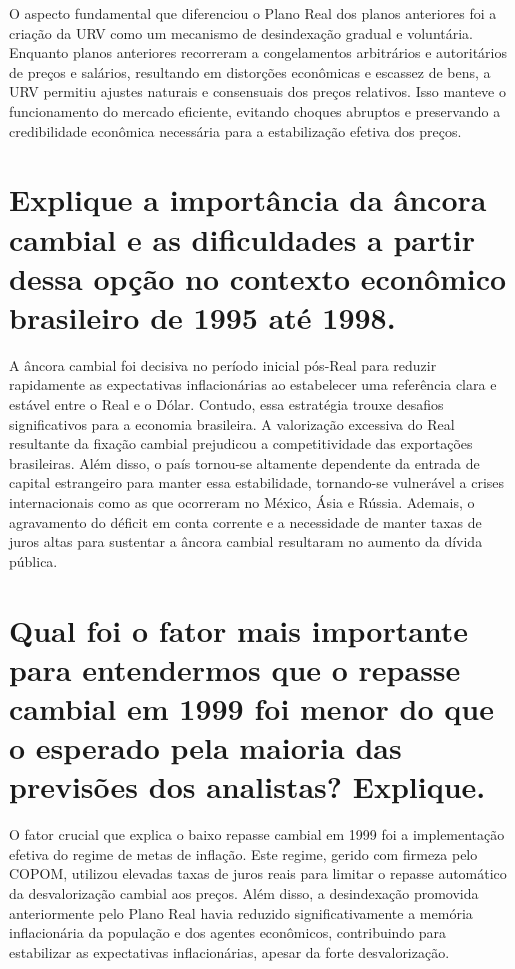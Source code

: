 \documentclass{sciposter}
\begin{document}
\begin{multicols}{3}
O aspecto fundamental que diferenciou o Plano Real dos planos anteriores foi a criação da URV como um mecanismo de desindexação gradual e voluntária. Enquanto planos anteriores recorreram a congelamentos arbitrários e autoritários de preços e salários, resultando em distorções econômicas e escassez de bens, a URV permitiu ajustes naturais e consensuais dos preços relativos. Isso manteve o funcionamento do mercado eficiente, evitando choques abruptos e preservando a credibilidade econômica necessária para a estabilização efetiva dos preços.

\section{\textbf{Explique a importância da âncora cambial e as dificuldades a partir dessa opção no contexto econômico brasileiro de 1995 até 1998.}}

A âncora cambial foi decisiva no período inicial pós-Real para reduzir rapidamente as expectativas inflacionárias ao estabelecer uma referência clara e estável entre o Real e o Dólar. Contudo, essa estratégia trouxe desafios significativos para a economia brasileira. A valorização excessiva do Real resultante da fixação cambial prejudicou a competitividade das exportações brasileiras. Além disso, o país tornou-se altamente dependente da entrada de capital estrangeiro para manter essa estabilidade, tornando-se vulnerável a crises internacionais como as que ocorreram no México, Ásia e Rússia. Ademais, o agravamento do déficit em conta corrente e a necessidade de manter taxas de juros altas para sustentar a âncora cambial resultaram no aumento da dívida pública.

\section{\textbf{Qual foi o fator mais importante para entendermos que o repasse cambial em 1999 foi menor do que o esperado pela maioria das previsões dos analistas? Explique.}}

O fator crucial que explica o baixo repasse cambial em 1999 foi a implementação efetiva do regime de metas de inflação. Este regime, gerido com firmeza pelo COPOM, utilizou elevadas taxas de juros reais para limitar o repasse automático da desvalorização cambial aos preços. Além disso, a desindexação promovida anteriormente pelo Plano Real havia reduzido significativamente a memória inflacionária da população e dos agentes econômicos, contribuindo para estabilizar as expectativas inflacionárias, apesar da forte desvalorização.



\end{multicols}
\end{document}
